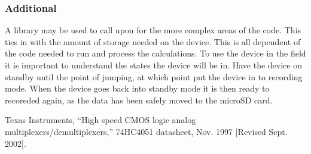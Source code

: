 \documentclass{report}
\begin{document}
\subsubsection{Additional}
A library  may be used to call upon for the more complex areas of the code. This ties in with the amount of storage needed on the device. This is all dependent of the code needed to run and process the calculations. 
To use the device in the field it is important to understand the states the device will be in. Have the device on standby until the point of jumping, at which point put the device in to recording mode. When the device goes back into standby mode it is then ready to recoreded again, as the data has been safely moved to the microSD card. 
  
  
  
  
  
  \begin{thebibliography}{1}

  \bibitem [1] Texas Instruments, “High speed CMOS logic analog
multiplexers/demultiplexers,” 74HC4051 datasheet, Nov. 1997 [Revised Sept.
2002].

  \end{thebibliography}

 
\end{document}
